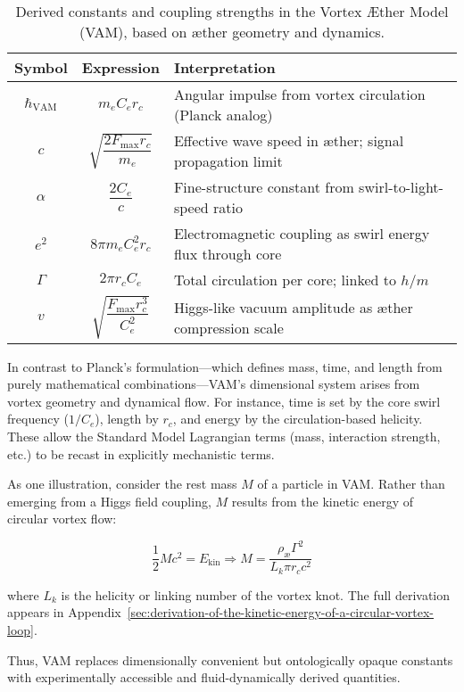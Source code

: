 \begin{table}[H]
    \centering
    \footnotesize
    \renewcommand{\arraystretch}{1.3}
    \begin{tabular}{|c|c|l|}
        \hline
        \textbf{Symbol} & \textbf{Expression} & \textbf{Interpretation} \\
        \hline
        $\hbar_\text{VAM}$ & $m_e C_e r_c$ & Angular impulse from vortex circulation (Planck analog) \\
        \hline
        $c$ & $\sqrt{\dfrac{2 F_\text{max} r_c}{m_e}}$ & Effective wave speed in æther; signal propagation limit \\
        \hline
        $\alpha$ & $\dfrac{2 C_e}{c}$ & Fine-structure constant from swirl-to-light-speed ratio \\
        \hline
        $e^2$ & $8\pi m_e C_e^2 r_c$ & Electromagnetic coupling as swirl energy flux through core \\
        \hline
        $\Gamma$ & $2\pi r_c C_e$ & Total circulation per core; linked to $h/m$ \\
        \hline
        $v$ & $\sqrt{\dfrac{F_\text{max} r_c^3}{C_e^2}}$ & Higgs-like vacuum amplitude as æther compression scale \\
        \hline
    \end{tabular}
    \caption{Derived constants and coupling strengths in the Vortex Æther Model (VAM), based on æther geometry and dynamics.}
    \label{tab:VAM_constants}
\end{table}

In contrast to Planck’s formulation—which defines mass, time, and length from purely mathematical combinations—VAM's dimensional system arises from vortex geometry and dynamical flow. For instance, time is set by the core swirl frequency ($1/C_e$), length by $r_c$, and energy by the circulation-based helicity. These allow the Standard Model Lagrangian terms (mass, interaction strength, etc.) to be recast in explicitly mechanistic terms.

As one illustration, consider the rest mass $M$ of a particle in VAM. Rather than emerging from a Higgs field coupling, $M$ results from the kinetic energy of circular vortex flow:

\begin{equation}
    \frac{1}{2} M c^2 = E_\text{kin} \Rightarrow M = \frac{\rho_\text{\ae} \Gamma^2}{L_k \pi r_c c^2}
\end{equation}

where $L_k$ is the helicity or linking number of the vortex knot. The full derivation appears in Appendix~\ref{sec:derivation-of-the-kinetic-energy-of-a-circular-vortex-loop}.

Thus, VAM replaces dimensionally convenient but ontologically opaque constants with experimentally accessible and fluid-dynamically derived quantities.

